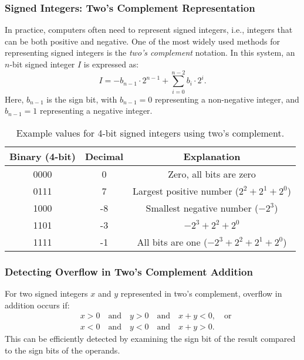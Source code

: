 \subsubsection{Signed Integers: Two's Complement Representation}

In practice, computers often need to represent signed integers, i.e., integers that can be both positive and negative. One of the most widely used methods for representing signed integers is the \emph{two's complement} notation. In this system, an $n$-bit signed integer $I$ is expressed as:
\[
I = -b_{n-1} \cdot 2^{n-1} + \sum_{i=0}^{n-2} b_i \cdot 2^i.
\]
Here, $b_{n-1}$ is the sign bit, with $b_{n-1} = 0$ representing a non-negative integer, and $b_{n-1} = 1$ representing a negative integer.

\begin{table}[h]
	\centering
	\begin{tabular}{|c|c|c|}
		\hline
		\textbf{Binary (4-bit)} & \textbf{Decimal} & \textbf{Explanation}                \\ \hline
		0000                     & 0                & Zero, all bits are zero             \\ \hline
		0111                     & 7                & Largest positive number ($2^2 + 2^1 + 2^0$) \\ \hline
		1000                     & -8               & Smallest negative number ($-2^3$)   \\ \hline
		1101                     & -3               & $-2^3 + 2^2 + 2^0$                 \\ \hline
		1111                     & -1               & All bits are one ($-2^3 + 2^2 + 2^1 + 2^0$) \\ \hline
	\end{tabular}
	\caption{Example values for 4-bit signed integers using two's complement.}
\end{table}

\subsubsection{Detecting Overflow in Two's Complement Addition}

For two signed integers $x$ and $y$ represented in two's complement, overflow in addition occurs if:
\[
\begin{aligned}
	&x > 0 \quad \text{and} \quad y > 0 \quad \text{and} \quad x + y < 0, \quad \text{or} \\
	&x < 0 \quad \text{and} \quad y < 0 \quad \text{and} \quad x + y > 0.
\end{aligned}
\]
This can be efficiently detected by examining the sign bit of the result compared to the sign bits of the operands.

